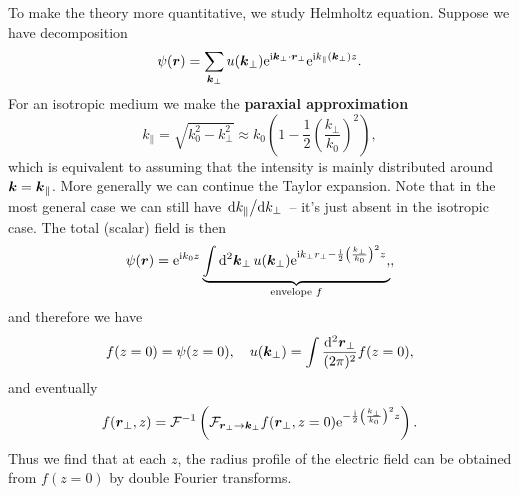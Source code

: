 \documentclass[hyperref, a4paper]{article}
\newcommand*{\ii}{\mathrm{i}}
\newcommand*{\ee}{\mathrm{e}}
\newcommand*{\concept}[1]{{\textbf{#1}}}
\begin{document}
To make the theory more quantitative, 
we study Helmholtz equation. 
Suppose we have decomposition 
\begin{equation}
    \psi(\vb*{r}) = \sum_{\vb*{k}_\bot} u(\vb*{k}_\bot) 
    \ee^{\ii \vb*{k}_\bot \cdot \vb*{r}_\bot} \ee^{\ii {k}_\parallel (\vb*{k}_\bot) z} .
\end{equation}
For an isotropic medium we make the \concept{paraxial approximation}
\begin{equation}
    k_\parallel = \sqrt{k_0^2 - k_\bot^2} \approx k_0 \left(
        1 - \frac{1}{2} \left(\frac{k_\bot}{k_0}\right)^2
    \right),
\end{equation}
which is equivalent to assuming that the intensity 
is mainly distributed around $\vb*{k} = \vb*{k}_\parallel$.
More generally we can continue the Taylor expansion.
Note that in the most general case we can still have $\dv*{k_\parallel}{k_\bot}$
-- it's just absent in the isotropic case.
The total (scalar) field is then 
\begin{equation}
    \psi(\vb*{r}) = \ee^{\ii k_0 z} \underbrace{
        \int \dd[2]{\vb*{k}_\bot} u(\vb*{k}_\bot) 
        \ee^{
            \ii k_\bot r_\bot - \frac{\ii}{2} \left(\frac{k_\bot}{k_0}\right)^2 z
        },
    }_{\text{envelope $f$}},
\end{equation}
and therefore we have  
\begin{equation}
    f(z = 0) = \psi(z = 0), \quad 
    u(\vb*{k}_\bot) = \int \frac{\dd[2]{\vb*{r}_\bot}}{(2\pi)^2} f(z = 0),
\end{equation}
and eventually 
\begin{equation}
    f(\vb*{r}_\bot, z) = \mathcal{F}^{-1} \left(
        \mathcal{F}_{\vb*{r}_\bot \to \vb*{k}_\bot} f(\vb*{r}_\bot, z = 0) 
        \ee^{- \frac{\ii}{2} \left(\frac{k_\bot}{k_0}\right)^2 z}
    \right).
\end{equation}
Thus we find that at each $z$, the radius profile of the electric field 
can be obtained from $f(z=0)$ by double Fourier transforms.
\end{document}
